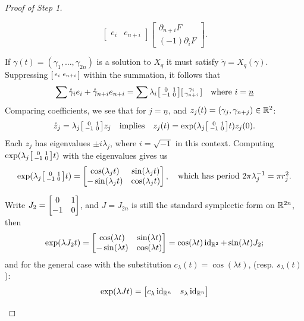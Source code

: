 \documentclass[../main-v2-manifolds.tex]{subfiles}
\begin{document}
\begin{proof}[Proof of Step 1]
\begin{note}
\[\begin{bmatrix}
            e_i & e_{n+i}
        \end{bmatrix}\begin{bmatrix}
            \partial_{n+i}F \\ (-1)\partial_{i}F 
        \end{bmatrix}.
    \]
\end{note}
If $\gamma(t) = (\gamma_1,\ldots,\gamma_{2n})$ is a solution to $X_q$ it must satisfy $\mathring{\gamma} = X_q(\gamma)$. Suppressing $\begin{bsmallmatrix} e_i & e_{n+i} \end{bsmallmatrix}$ within the summation, it follows that
\[
\sum \mathring{\gamma}_ie_{i} + \mathring{\gamma}_{n+i}e_{n+i} =\sum\lambda_i\begin{bsmallmatrix} 0 & 1 \\ -1 & 0 \end{bsmallmatrix} \begin{bsmallmatrix}
    \gamma_i \\ \gamma_{n+i}
\end{bsmallmatrix}\quad\text{where }i=\underline{n}\] 
Comparing coefficients, we see that for $j = \underline{n}$, and $z_j(t) = (\gamma_j, \gamma_{n+j})\in\mathbb{R}^2$:
\[
    \mathring{z}_j = \lambda_j \sysmallmatrix z_j\qqtext{implies} z_j(t) = \exp(\lambda_j \sysmallmatrix t)z_j(0).
\]
Each $z_j$ has eigenvalues $\pm i\lambda_j$, where $i = \sqrt{-1}$ in this context. Computing $\operatorname{exp}(\lambda_j \begin{bsmallmatrix} 0 & 1 \\ -1 & 0 \end{bsmallmatrix} t)$ with the eigenvalues gives us
\[
    \operatorname{exp}(\lambda_j \begin{bsmallmatrix} 0 & 1 \\ -1 & 0 \end{bsmallmatrix} t) = \begin{bmatrix}
        \cos(\lambda_j t) & \sin(\lambda_j t)\\
        -\sin(\lambda_j t) & \cos(\lambda_j t)
    \end{bmatrix},\quad\text{which has period }2\pi \lambda_j^{-1} = \pi r_j^2.
\]
\begin{note}
    Write $J_2 = \begin{bmatrix} 0 & 1 \\ -1 & 0 \end{bmatrix}$, and $J = J_{2n}$ is still the standard symplectic form on ${\mathbb{R}^{2n}}$, then
    \begin{equation}
        \operatorname{exp}(\lambda J_2 t) = \begin{bmatrix}
            \cos(\lambda t) & \sin(\lambda t)\\
            -\sin(\lambda t) & \cos(\lambda t)
        \end{bmatrix} = \cos(\lambda t)\operatorname{id}_{\mathbb{R}^2} + \sin(\lambda t)J_2;
        \label{eq:matrix exponential j2 lambda}
    \end{equation}
    and for the general case with the substitution $c_\lambda(t) = \cos(\lambda t)$, (resp. $s_\lambda(t)$):
    \begin{equation}
        \operatorname{exp}(\lambda J t) = \begin{bmatrix}
            c_\lambda \operatorname{id}_{{\mathbb{R}^n}} & s_\lambda \operatorname{id}_{{\mathbb{R}^n}} \\ 

\end{bmatrix}
\end{equation}
\end{note}
\end{proof}
\end{document}
